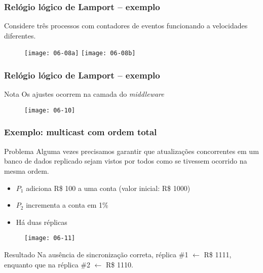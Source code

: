 \documentclass[Ligatures=TeX,table,brazil,svgnames,usetotalslideindicator,compress,10pt]{beamer}
\begin{document}
\begin{frame}
  \frametitle{Relógio lógico de Lamport -- exemplo}

  Considere três processos com \alert{contadores de eventos} funcionando a velocidades diferentes.

  \begin{figure}
    \centering
    \texttt{[image: 06-08a]}
    \hfill{}
    \texttt{[image: 06-08b]}
  \end{figure}

\end{frame}

\begin{frame}
  \frametitle{Relógio lógico de Lamport -- exemplo}

  \begin{alertblock}{Nota}
    Os ajustes ocorrem na camada do \textit{middleware}
  \end{alertblock}

  \begin{figure}
    \centering
    \texttt{[image: 06-10]}
  \end{figure}

\end{frame}

\begin{frame}
  \frametitle{Exemplo: multicast com ordem total}
  \begin{alertblock}{Problema}
    Alguma vezes precisamos garantir que atualizações concorrentes em um banco de dados replicado sejam vistos por todos como se tivessem ocorrido na mesma ordem.

  \begin{itemize}
  \item $P_1$ adiciona R\$ 100 a uma conta (valor inicial: R\$ 1000)
  \item $P_2$ incrementa a conta em 1\%
  \item Há duas réplicas
  \end{itemize}
\end{alertblock}

\begin{figure}
  \centering
  \texttt{[image: 06-11]}
\end{figure}

\vspace{-1ex}
\begin{block}{Resultado}
  Na ausência de sincronização correta, \newline réplica \#1 $\leftarrow$ R\$ 1111, enquanto que na réplica \#2 $\leftarrow$ R\$ 1110.
\end{block}

\end{frame}
\end{document}
